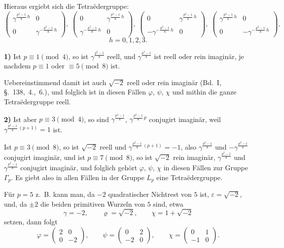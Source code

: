 \documentclass[12pt,a4paper]{article}
\begin{document}
\newpage
{}

Hieraus ergiebt sich die Tetraëdergruppe:
\[
\begin{pmatrix}\gamma^{\frac{p^{2}-1}{8}\,h}&0\\[4pt]0&\gamma^{-\frac{p^{2}-1}{8}\,h}\end{pmatrix},\;
\begin{pmatrix}0&\gamma^{\frac{p^{2}-1}{8}\,h}\\[4pt]\gamma^{-\frac{p^{2}-1}{8}\,h}&0\end{pmatrix},\;
\begin{pmatrix}0&\gamma^{\frac{p^{2}-1}{8}\,h}\\[4pt]-\gamma^{-\frac{p^{2}-1}{8}\,h}&0\end{pmatrix},\;
\begin{pmatrix}\gamma^{\frac{p^{2}-1}{8}\,h}&0\\[4pt]0&-\gamma^{-\frac{p^{2}-1}{8}\,h}\end{pmatrix},
\]
\[
h = 0, 1, 2, 3.
\]

\medskip\noindent
\textbf{1)} Ist $p \equiv 1 \pmod{4}$, so ist $\gamma^{\frac{p^{2}-1}{8}}$ reell, und $\gamma^{\frac{p^{2}-1}{8}}$ ist reell oder rein imaginär, je nachdem $p \equiv 1$ oder $\equiv 5 \pmod{8}$ ist.

Uebereinstimmend damit ist auch $\sqrt{-2}$ reell oder rein imaginär (Bd.~I, \S.~138,~4.,~6.), und folglich ist in diesen Fällen $\varphi$, $\psi$, $\chi$ und mithin die ganze Tetraëdergruppe reell.

\medskip\noindent
\textbf{2)} Ist aber $p \equiv 3 \pmod{4}$, so sind $\gamma^{\frac{p^{2}-1}{8}}$, $\gamma^{\frac{p^{2}-1}{8}\,p}$ conjugirt imaginär, weil $\gamma^{\frac{p^{2}-1}{8}\,(p+1)} = 1$ ist.

Ist $p \equiv 3 \pmod{8}$, so ist $\sqrt{-2}$ reell und $\gamma^{\frac{p^{2}-1}{8}\,(p+1)} = -1$, also $\gamma^{\frac{p^{2}-1}{8}}$ und $-\gamma^{\frac{p^{2}-1}{8}}$ conjugirt imaginär, und ist $p \equiv 7 \pmod{8}$, so ist $\sqrt{-2}$ rein imaginär, $\gamma^{\frac{p^{2}-1}{8}}$ und $\gamma^{\frac{p^{2}-1}{8}}$ conjugirt imaginär, und folglich gehört $\varphi$, $\psi$, $\chi$ in diesen Fällen zur Gruppe $\varGamma_{p}$. Es giebt also in allen Fällen in der Gruppe $L_{p}$ eine Tetraëdergruppe.

Für $p = 5$ z.~B. kann man, da $-2$ quadratischer Nichtrest von $5$ ist, $\varepsilon = \sqrt{-2}$, und, da $\pm 2$ die beiden primitiven Wurzeln von $5$ sind, etwa
\[
\gamma = -2,\qquad \varrho = \sqrt{-2},\qquad
\chi = 1 + \sqrt{-2}
\]
setzen, dann folgt
\[
\varphi = \begin{pmatrix}2&0\\0&-2\end{pmatrix},\qquad
\psi = \begin{pmatrix}0&2\\-2&0\end{pmatrix},\qquad
\chi = \begin{pmatrix}0&1\\-1&0\end{pmatrix}.
\]
\end{document}
